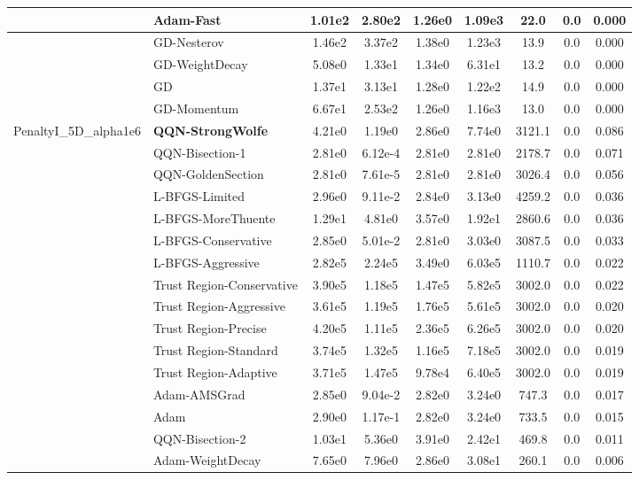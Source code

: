 \documentclass{article}
\begin{document}
\begin{longtable}{|l|l|c|c|c|c|c|c|c|}
\hline
 & Adam-Fast & 1.01e2 & 2.80e2 & 1.26e0 & 1.09e3 & 22.0 & 0.0 & 0.000 \\
\hline
 & GD-Nesterov & 1.46e2 & 3.37e2 & 1.38e0 & 1.23e3 & 13.9 & 0.0 & 0.000 \\
\hline
 & GD-WeightDecay & 5.08e0 & 1.33e1 & 1.34e0 & 6.31e1 & 13.2 & 0.0 & 0.000 \\
\hline
 & GD & 1.37e1 & 3.13e1 & 1.28e0 & 1.22e2 & 14.9 & 0.0 & 0.000 \\
\hline
 & GD-Momentum & 6.67e1 & 2.53e2 & 1.26e0 & 1.16e3 & 13.0 & 0.0 & 0.000 \\
PenaltyI\_5D\_alpha1e6 & \textbf{QQN-StrongWolfe} & 4.21e0 & 1.19e0 & 2.86e0 & 7.74e0 & 3121.1 & 0.0 & 0.086 \\
\hline
 & QQN-Bisection-1 & 2.81e0 & 6.12e-4 & 2.81e0 & 2.81e0 & 2178.7 & 0.0 & 0.071 \\
\hline
 & QQN-GoldenSection & 2.81e0 & 7.61e-5 & 2.81e0 & 2.81e0 & 3026.4 & 0.0 & 0.056 \\
\hline
 & L-BFGS-Limited & 2.96e0 & 9.11e-2 & 2.84e0 & 3.13e0 & 4259.2 & 0.0 & 0.036 \\
\hline
 & L-BFGS-MoreThuente & 1.29e1 & 4.81e0 & 3.57e0 & 1.92e1 & 2860.6 & 0.0 & 0.036 \\
\hline
 & L-BFGS-Conservative & 2.85e0 & 5.01e-2 & 2.81e0 & 3.03e0 & 3087.5 & 0.0 & 0.033 \\
\hline
 & L-BFGS-Aggressive & 2.82e5 & 2.24e5 & 3.49e0 & 6.03e5 & 1110.7 & 0.0 & 0.022 \\
\hline
 & Trust Region-Conservative & 3.90e5 & 1.18e5 & 1.47e5 & 5.82e5 & 3002.0 & 0.0 & 0.022 \\
\hline
 & Trust Region-Aggressive & 3.61e5 & 1.19e5 & 1.76e5 & 5.61e5 & 3002.0 & 0.0 & 0.020 \\
\hline
 & Trust Region-Precise & 4.20e5 & 1.11e5 & 2.36e5 & 6.26e5 & 3002.0 & 0.0 & 0.020 \\
\hline
 & Trust Region-Standard & 3.74e5 & 1.32e5 & 1.16e5 & 7.18e5 & 3002.0 & 0.0 & 0.019 \\
\hline
 & Trust Region-Adaptive & 3.71e5 & 1.47e5 & 9.78e4 & 6.40e5 & 3002.0 & 0.0 & 0.019 \\
\hline
 & Adam-AMSGrad & 2.85e0 & 9.04e-2 & 2.82e0 & 3.24e0 & 747.3 & 0.0 & 0.017 \\
\hline
 & Adam & 2.90e0 & 1.17e-1 & 2.82e0 & 3.24e0 & 733.5 & 0.0 & 0.015 \\
\hline
 & QQN-Bisection-2 & 1.03e1 & 5.36e0 & 3.91e0 & 2.42e1 & 469.8 & 0.0 & 0.011 \\
\hline
 & Adam-WeightDecay & 7.65e0 & 7.96e0 & 2.86e0 & 3.08e1 & 260.1 & 0.0 & 0.006 \\

\end{longtable}
\end{document}
